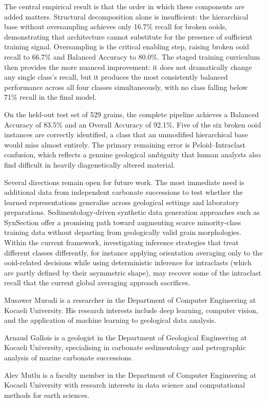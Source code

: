 \documentclass[a4paper,fleqn]{cas-dc}
\begin{document}
The central empirical result is that the order in which these components are added matters. Structural decomposition alone is insufficient: the hierarchical base without oversampling achieves only 16.7\% recall for broken ooids, demonstrating that architecture cannot substitute for the presence of sufficient training signal. Oversampling is the critical enabling step, raising broken ooid recall to 66.7\% and Balanced Accuracy to 80.0\%. The staged training curriculum then provides the more nuanced improvement: it does not dramatically change any single class's recall, but it produces the most consistently balanced performance across all four classes simultaneously, with no class falling below 71\% recall in the final model.

On the held-out test set of 529 grains, the complete pipeline achieves a Balanced Accuracy of 83.5\% and an Overall Accuracy of 92.1\%. Five of the six broken ooid instances are correctly identified, a class that an unmodified hierarchical base would miss almost entirely. The primary remaining error is Peloid--Intraclast confusion, which reflects a genuine geological ambiguity that human analysts also find difficult in heavily diagenetically altered material.

Several directions remain open for future work. The most immediate need is additional data from independent carbonate successions to test whether the learned representations generalise across geological settings and laboratory preparations. Sedimentology-driven synthetic data generation approaches such as SynSection \citep{ransinangue2025synsection} offer a promising path toward augmenting scarce minority-class training data without departing from geologically valid grain morphologies. Within the current framework, investigating inference strategies that treat different classes differently, for instance applying orientation averaging only to the ooid-related decisions while using deterministic inference for intraclasts (which are partly defined by their asymmetric shape), may recover some of the intraclast recall that the current global averaging approach sacrifices.

\printcredits




\bio{}
Musawer Muradi is a researcher in the Department of Computer Engineering at Kocaeli University. His research interests include deep learning, computer vision, and the application of machine learning to geological data analysis.
\endbio

\bio{}
Arnaud Gallois is a geologist in the Department of Geological Engineering at Kocaeli University, specialising in carbonate sedimentology and petrographic analysis of marine carbonate successions.
\endbio

\bio{}
Alev Mutlu is a faculty member in the Department of Computer Engineering at Kocaeli University with research interests in data science and computational methods for earth sciences.
\endbio
\end{document}
